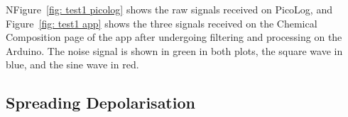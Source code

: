 NFigure~\ref{fig: test1 picolog} shows the raw signals received on PicoLog, and Figure~\ref{fig: test1 app} shows the three signals received on the Chemical Composition page of the app after undergoing filtering and processing on the Arduino. The noise signal is shown in green in both plots, the square wave in blue, and the sine wave in red.


\subsection{Spreading Depolarisation}